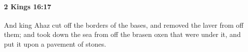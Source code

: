 
		\paragraph{2 Kings 16:17} %
			\label{2KINGS-16-17}

			And king Ahaz cut off the borders of the bases, and removed the laver from off them; and took down the sea from off the brasen oxen that were under it, and put it upon a pavement of stones.


